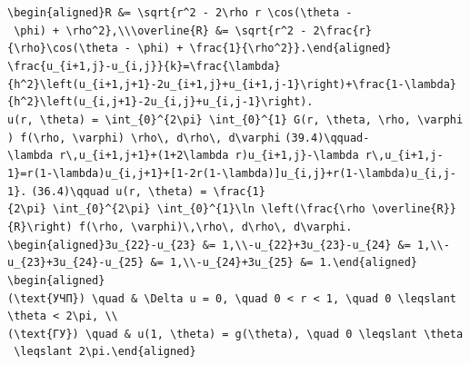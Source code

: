 \documentclass[
  ukrainian,
]{article}
\begin{document}
\texttt{\textbackslash{}begin\{aligned\}R\ \&=\ \textbackslash{}sqrt\{r\^{}2\ -\ 2\textbackslash{}rho\ r\ \textbackslash{}cos(\textbackslash{}theta\ -\ \textbackslash{}phi)\ +\ \textbackslash{}rho\^{}2\},\textbackslash{}\textbackslash{}\textbackslash{}overline\{R\}\ \&=\ \textbackslash{}sqrt\{r\^{}2\ -\ 2\textbackslash{}frac\{r\}\{\textbackslash{}rho\}\textbackslash{}cos(\textbackslash{}theta\ -\ \textbackslash{}phi)\ +\ \textbackslash{}frac\{1\}\{\textbackslash{}rho\^{}2\}\}.\textbackslash{}end\{aligned\}}
\texttt{\textbackslash{}frac\{u\_\{i+1,j\}-u\_\{i,j\}\}\{k\}=\textbackslash{}frac\{\textbackslash{}lambda\}\{h\^{}2\}\textbackslash{}left(u\_\{i+1,j+1\}-2u\_\{i+1,j\}+u\_\{i+1,j-1\}\textbackslash{}right)+\textbackslash{}frac\{1-\textbackslash{}lambda\}\{h\^{}2\}\textbackslash{}left(u\_\{i,j+1\}-2u\_\{i,j\}+u\_\{i,j-1\}\textbackslash{}right).}
\texttt{u(r,\ \textbackslash{}theta)\ =\ \textbackslash{}int\_\{0\}\^{}\{2\textbackslash{}pi\}\ \textbackslash{}int\_\{0\}\^{}\{1\}\ G(r,\ \textbackslash{}theta,\ \textbackslash{}rho,\ \textbackslash{}varphi)\ f(\textbackslash{}rho,\ \textbackslash{}varphi)\ \textbackslash{}rho\textbackslash{},\ d\textbackslash{}rho\textbackslash{},\ d\textbackslash{}varphi}
\texttt{(39.4)\textbackslash{}qquad-\textbackslash{}lambda\ r\textbackslash{},u\_\{i+1,j+1\}+(1+2\textbackslash{}lambda\ r)u\_\{i+1,j\}-\textbackslash{}lambda\ r\textbackslash{},u\_\{i+1,j-1\}=r(1-\textbackslash{}lambda)u\_\{i,j+1\}+{[}1-2r(1-\textbackslash{}lambda){]}u\_\{i,j\}+r(1-\textbackslash{}lambda)u\_\{i,j-1\}.}
\texttt{(36.4)\textbackslash{}qquad\ u(r,\ \textbackslash{}theta)\ =\ \textbackslash{}frac\{1\}\{2\textbackslash{}pi\}\ \textbackslash{}int\_\{0\}\^{}\{2\textbackslash{}pi\}\ \textbackslash{}int\_\{0\}\^{}\{1\}\textbackslash{}ln\ \textbackslash{}left(\textbackslash{}frac\{\textbackslash{}rho\ \textbackslash{}overline\{R\}\}\{R\}\textbackslash{}right)\ f(\textbackslash{}rho,\ \textbackslash{}varphi)\textbackslash{},\textbackslash{}rho\textbackslash{},\ d\textbackslash{}rho\textbackslash{},\ d\textbackslash{}varphi.}
\texttt{\textbackslash{}begin\{aligned\}3u\_\{22\}-u\_\{23\}\ \&=\ 1,\textbackslash{}\textbackslash{}-u\_\{22\}+3u\_\{23\}-u\_\{24\}\ \&=\ 1,\textbackslash{}\textbackslash{}-u\_\{23\}+3u\_\{24\}-u\_\{25\}\ \&=\ 1,\textbackslash{}\textbackslash{}-u\_\{24\}+3u\_\{25\}\ \&=\ 1.\textbackslash{}end\{aligned\}}
\texttt{\textbackslash{}begin\{aligned\}(\textbackslash{}text\{УЧП\})\ \textbackslash{}quad\ \&\ \textbackslash{}Delta\ u\ =\ 0,\ \textbackslash{}quad\ 0\ \textless{}\ r\ \textless{}\ 1,\ \textbackslash{}quad\ 0\ \textbackslash{}leqslant\ \textbackslash{}theta\ \textless{}\ 2\textbackslash{}pi,\ \textbackslash{}\textbackslash{}(\textbackslash{}text\{ГУ\})\ \textbackslash{}quad\ \&\ u(1,\ \textbackslash{}theta)\ =\ g(\textbackslash{}theta),\ \textbackslash{}quad\ 0\ \textbackslash{}leqslant\ \textbackslash{}theta\ \textbackslash{}leqslant\ 2\textbackslash{}pi.\textbackslash{}end\{aligned\}}
\end{document}
